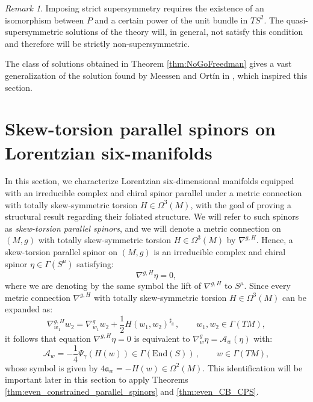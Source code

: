 \documentclass[10pt,a4paper,twoside,reqno]{amsart}
\theoremstyle{plain}
\theoremstyle{definition}
\theoremstyle{remark}
\newtheorem{remark}[thm]{Remark}
\newcommand{\End}{\mathrm{End}}
\def\fra{\mathfrak{a}}
\def\cA{\mathcal{A}}
\begin{document}
\begin{remark}
Imposing strict supersymmetry requires the existence of an isomorphism between $P$ and a certain power of the unit bundle in $TS^2$. The quasi-supersymmetric solutions of the theory will, in general, not satisfy this condition and therefore will be strictly non-supersymmetric.
\end{remark}

The class of solutions obtained in Theorem \ref{thm:NoGoFreedman} gives a vast generalization of the solution found by Meessen and Ortín in \cite{Meessen:2010ph}, which inspired this section.


\section{Skew-torsion parallel spinors on Lorentzian six-manifolds}
\label{sec:skewtorsionparallel}


In this section, we characterize Lorentzian six-dimensional manifolds equipped with an irreducible complex and chiral spinor parallel under a metric connection with totally skew-symmetric torsion $H\in \Omega^3(M)$, with the goal of proving a structural result regarding their foliated structure. We will refer to such spinors as \emph{skew-torsion parallel spinors}, and we will denote a metric connection on $(M,g)$ with totally skew-symmetric torsion $H\in \Omega^3(M)$ by $\nabla^{g,H}$. Hence, a skew-torsion parallel spinor on $(M,g)$ is an irreducible complex and chiral spinor $\eta\in \Gamma(S^{\mu})$ satisfying:
\begin{equation*}
\nabla^{g,H} \eta = 0,
\end{equation*}
where we are denoting by the same symbol the lift of $\nabla^{g,H}$ to $S^{\mu}$. Since every metric connection $\nabla^{g,H}$ with totally skew-symmetric torsion $H\in \Omega^3(M)$ can be expanded as: 
\begin{equation*}
 \nabla^{g,H}_{w_1}w_2=\nabla^g_{w_1}w_2+\frac{1}{2}H(w_1,w_2)^{\sharp_g}  \, , \qquad w_1 , w_2 \in\Gamma(TM),
\end{equation*}
it follows that equation $\nabla^{g,H}\eta=0$ is equivalent to $\nabla^g_w\eta=\cA_w(\eta)$ with:
\begin{equation*}
\cA_w = -\frac{1}{4}\Psi_\gamma(H(w)) \in\Gamma(\End(S))\, , \qquad w\in\Gamma(TM),
\end{equation*}
whose symbol is given by $4\fra_w = -H(w)\in\Omega^2(M)$. This identification will be important later in this section to apply Theorems \ref{thm:even_constrained_parallel_spinors} and \ref{thm:even_CB_CPS}.\medskip
\end{document}
